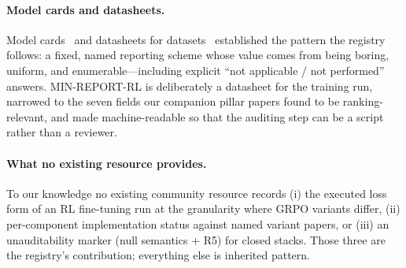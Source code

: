 \paragraph{Model cards and datasheets.}
Model cards~\citep{mitchell2019modelcards} and datasheets for
datasets~\citep{gebru2021datasheets} established the pattern the registry
follows: a fixed, named reporting scheme whose value comes from being boring,
uniform, and enumerable---including explicit ``not applicable / not
performed'' answers. MIN-REPORT-RL is deliberately a datasheet for the
training run, narrowed to the seven fields our companion pillar papers found
to be ranking-relevant, and made machine-readable so that the auditing step
can be a script rather than a reviewer.

\paragraph{What no existing resource provides.}
To our knowledge no existing community resource records (i) the executed loss
form of an RL fine-tuning run at the granularity where GRPO variants differ,
(ii) per-component implementation status against named variant papers, or
(iii) an unauditability marker (null semantics + R5) for closed stacks. Those
three are the registry's contribution; everything else is inherited pattern.
